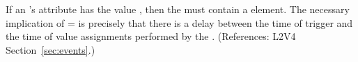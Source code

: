 If an \Event's  attribute has the value
, then the \Event must contain a \Delay element.  The necessary
implication of = is precisely
that there is a delay between the time of trigger and the time of value
assignments performed by the \Event.  (References: L2V4
Section~\ref{sec:events}.)
